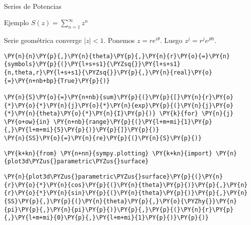     \begin{center}
    \end{center}
    { \hspace*{\fill} \\}
    
    Series de Potencias

Ejemplo \(S(z)=\sum\limits_{n=1}^{\infty}z^n\)

Serie geométrica converge \(|z|<1\). Ponemos \(z=r e^{i\theta}\). Luego
\(z^j=r^je^{j\theta i}\).

    \begin{tcolorbox}[breakable, size=fbox, boxrule=1pt, pad at break*=1mm,colback=cellbackground, colframe=cellborder]
\begin{Verbatim}[commandchars=\\\{\}]
\PY{n}{n}\PY{p}{,}\PY{n}{theta}\PY{p}{,}\PY{n}{r}\PY{o}{=}\PY{n}{symbols}\PY{p}{(}\PY{l+s+s1}{\PYZsq{}}\PY{l+s+s1}{n,theta,r}\PY{l+s+s1}{\PYZsq{}}\PY{p}{,}\PY{n}{real}\PY{o}{=}\PY{n+nb+bp}{True}\PY{p}{)}

\PY{n}{S}\PY{o}{=}\PY{n+nb}{sum}\PY{p}{(}\PY{p}{[}\PY{n}{r}\PY{o}{*}\PY{o}{*}\PY{n}{j}\PY{o}{*}\PY{n}{exp}\PY{p}{(}\PY{n}{j}\PY{o}{*}\PY{n}{theta}\PY{o}{*}\PY{n}{I}\PY{p}{)} \PY{k}{for} \PY{n}{j} \PY{o+ow}{in} \PY{n+nb}{range}\PY{p}{(}\PY{l+m+mi}{1}\PY{p}{,}\PY{l+m+mi}{5}\PY{p}{)}\PY{p}{]}\PY{p}{)}
\PY{n}{SS}\PY{o}{=}\PY{n}{re}\PY{p}{(}\PY{n}{S}\PY{p}{)}
\end{Verbatim}
\end{tcolorbox}

    \begin{tcolorbox}[breakable, size=fbox, boxrule=1pt, pad at break*=1mm,colback=cellbackground, colframe=cellborder]
\begin{Verbatim}[commandchars=\\\{\}]
\PY{k+kn}{from} \PY{n+nn}{sympy.plotting} \PY{k+kn}{import} \PY{n}{plot3d\PYZus{}parametric\PYZus{}surface}
\end{Verbatim}
\end{tcolorbox}

    \begin{tcolorbox}[breakable, size=fbox, boxrule=1pt, pad at break*=1mm,colback=cellbackground, colframe=cellborder]
\begin{Verbatim}[commandchars=\\\{\}]
\PY{n}{plot3d\PYZus{}parametric\PYZus{}surface}\PY{p}{(}\PY{n}{r}\PY{o}{*}\PY{n}{cos}\PY{p}{(}\PY{n}{theta}\PY{p}{)}\PY{p}{,}\PY{n}{r}\PY{o}{*}\PY{n}{sin}\PY{p}{(}\PY{n}{theta}\PY{p}{)}\PY{p}{,}\PY{n}{SS}\PY{p}{,}\PY{p}{(}\PY{n}{theta}\PY{p}{,}\PY{o}{\PYZhy{}}\PY{n}{pi}\PY{p}{,}\PY{n}{pi}\PY{p}{)}\PY{p}{,}\PY{p}{(}\PY{n}{r}\PY{p}{,}\PY{l+m+mi}{0}\PY{p}{,}\PY{l+m+mi}{1}\PY{p}{)}\PY{p}{)}
\end{Verbatim}
\end{tcolorbox}

